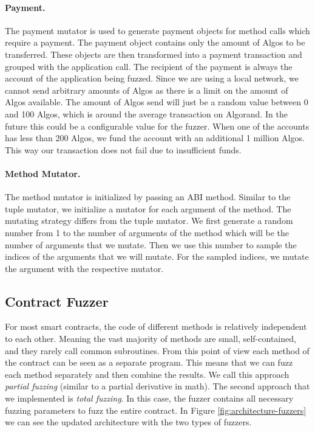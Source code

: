 \paragraph{Payment.}
The payment mutator is used to generate payment objects for method calls which require a payment.
The payment object contains only the amount of Algos to be transferred.
These objects are then transformed into a payment transaction and grouped with the application call.
The recipient of the payment is always the account of the application being fuzzed.
Since we are using a local network, we cannot send arbitrary amounts of Algos as there is a limit on the amount of Algos available.
The amount of Algos send will just be a random value between 0 and 100 Algos, which is around the average transaction on Algorand.
In the future this could be a configurable value for the fuzzer.
When one of the accounts has less than 200 Algos, we fund the account with an additional 1 million Algos.
This way our transaction does not fail due to insufficient funds.


\paragraph{Method Mutator.}
The method mutator is initialized by passing an \ac{ABI} method.
Similar to the tuple mutator, we initialize a mutator for each argument of the method.
The mutating strategy differs from the tuple mutator.
We first generate a random number from 1 to the number of arguments of the method which will be the number of arguments that we mutate.
Then we use this number to sample the indices of the arguments that we will mutate.
For the sampled indices, we mutate the argument with the respective mutator.


\subsection*{Contract Fuzzer}
For most smart contracts, the code of different methods is relatively independent to each other.
Meaning the vast majority of methods are small, self-contained, and they rarely call common subroutines.
From this point of view each method of the contract can be seen as a separate program.
This means that we can fuzz each method separately and then combine the results.
We call this approach \textit{partial fuzzing} (similar to a partial derivative in math). The second approach that we implemented is \textit{total fuzzing}.
In this case, the fuzzer contains all necessary fuzzing parameters to fuzz the entire contract.
In Figure \ref{fig:architecture-fuzzers} we can see the updated architecture with the two types of fuzzers.

